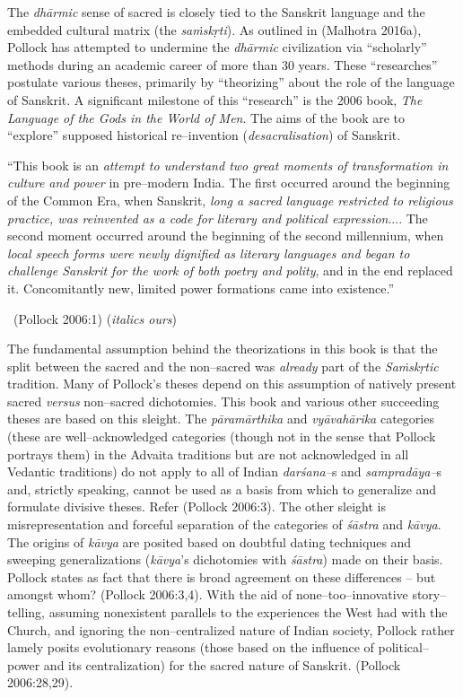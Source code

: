 The \textit{dhārmic} sense of sacred is closely tied to the Sanskrit language and the embedded cultural matrix (the \textit{saṁskṛti}). As outlined in (Malhotra 2016a), Pollock has attempted to undermine the \textit{dhārmic} civilization via “scholarly” methods during an academic career of more than 30 years. These “researches” postulate various theses, primarily by “theorizing” about the role of the language of Sanskrit. A significant milestone of this “research” is the 2006 book, \textit{The Language of the Gods in the World of Men}. The aims of the book are to “explore” supposed historical re–invention (\textit{desacralisation}) of Sanskrit.

\begin{myquote}
“This book is an \textit{attempt to understand two great moments of transformation in culture and power} in pre–modern India. The first occurred around the beginning of the Common Era, when Sanskrit, \textit{long a sacred language restricted to religious practice, was reinvented as a code for literary and political expression}.... The second moment occurred around the beginning of the second millennium, when \textit{local speech forms were newly dignified as literary languages and began to challenge Sanskrit for the work of both poetry and polity}, and in the end replaced it. Concomitantly new, limited power formations came into existence.” 

~\hfill (Pollock 2006:1) (\textit{italics ours})
\end{myquote}

The fundamental assumption behind the theorizations in this book is that the split between the sacred and the non–sacred was \textit{already} part of the \textit{Saṁskṛtic} tradition. Many of Pollock's theses depend on this assumption of natively present sacred \textit{versus} non–sacred dichotomies. This book and various other succeeding theses are based on this sleight. The \textit{pāramārthika} and \textit{vyāvahārika} categories (these are well–acknowledged categories (though not in the sense that Pollock portrays them) in the Advaita traditions but are not acknowledged in all Vedantic traditions) do not apply to all of Indian \textit{darśana–}s and \textit{sampradāya–}s and, strictly speaking, cannot be used as a basis from which to generalize and formulate divisive theses. Refer (Pollock 2006:3). The other sleight is misrepresentation and forceful separation of the categories of \textit{śāstra} and \textit{kāvya}. The origins of \textit{kāvya} are posited based on doubtful dating techniques and sweeping generalizations (\textit{kāvya}'s dichotomies with \textit{śāstra}) made on their basis. Pollock states as fact that there is broad agreement on these differences – but amongst whom? (Pollock 2006:3,4). With the aid of none–too–innovative story–telling, assuming nonexistent parallels to the experiences the West had with the Church, and ignoring the non–centralized nature of Indian society, Pollock rather lamely posits evolutionary reasons (those based on the influence of political–power and its centralization) for the sacred nature of Sanskrit. (Pollock 2006:28,29).

